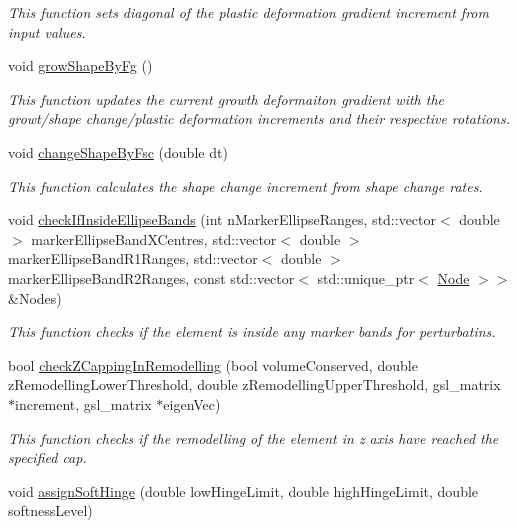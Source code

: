 \begin{DoxyCompactItemize}
\begin{DoxyCompactList}\small\item\em This function sets diagonal of the plastic deformation gradient increment from input values. \end{DoxyCompactList}\item 
void \hyperlink{classShapeBase_a29ee0eeca30fdd381d294b383c3baf0c}{grow\+Shape\+By\+Fg} ()
\begin{DoxyCompactList}\small\item\em This function updates the current growth deformaiton gradient with the growt/shape change/plastic deformation increments and their respective rotations. \end{DoxyCompactList}\item 
void \hyperlink{classShapeBase_a5409de18ee9e47af0bb977f4a1e608fb}{change\+Shape\+By\+Fsc} (double dt)
\begin{DoxyCompactList}\small\item\em This function calculates the shape change increment from shape change rates. \end{DoxyCompactList}\item 
\hypertarget{classShapeBase_afff5db36385d757b38b7caa117686ec1}{}void \hyperlink{classShapeBase_afff5db36385d757b38b7caa117686ec1}{check\+If\+Inside\+Ellipse\+Bands} (int n\+Marker\+Ellipse\+Ranges, std\+::vector$<$ double $>$ marker\+Ellipse\+Band\+X\+Centres, std\+::vector$<$ double $>$ marker\+Ellipse\+Band\+R1\+Ranges, std\+::vector$<$ double $>$ marker\+Ellipse\+Band\+R2\+Ranges, const std\+::vector$<$ std\+::unique\+\_\+ptr$<$ \hyperlink{classNode}{Node} $>$$>$ \&Nodes)\label{classShapeBase_afff5db36385d757b38b7caa117686ec1}

\begin{DoxyCompactList}\small\item\em This function checks if the element is inside any marker bands for perturbatins. \end{DoxyCompactList}\item 
bool \hyperlink{classShapeBase_a2e7fdc8e749b8b709b6c80248dc2bc3f}{check\+Z\+Capping\+In\+Remodelling} (bool volume\+Conserved, double z\+Remodelling\+Lower\+Threshold, double z\+Remodelling\+Upper\+Threshold, gsl\+\_\+matrix $\ast$increment, gsl\+\_\+matrix $\ast$eigen\+Vec)
\begin{DoxyCompactList}\small\item\em This function checks if the remodelling of the element in z axis have reached the specified cap. \end{DoxyCompactList}\item 
\hypertarget{classShapeBase_ade1370385074f4bdc2911b567b184308}{}void \hyperlink{classShapeBase_ade1370385074f4bdc2911b567b184308}{assign\+Soft\+Hinge} (double low\+Hinge\+Limit, double high\+Hinge\+Limit, double softness\+Level)\label{classShapeBase_ade1370385074f4bdc2911b567b184308}


\end{DoxyCompactItemize}
